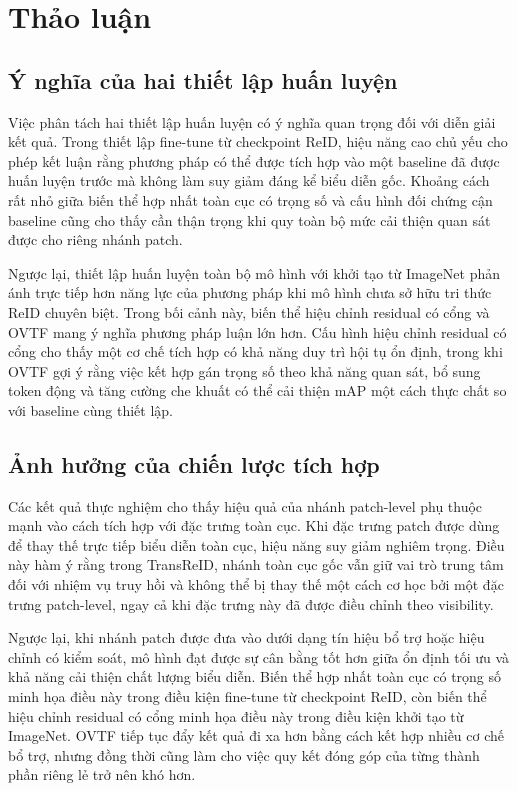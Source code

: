 \section{Thảo luận}
\label{sec:discussion}

\subsection{Ý nghĩa của hai thiết lập huấn luyện}

Việc phân tách hai thiết lập huấn luyện có ý nghĩa quan trọng đối với diễn giải kết quả. Trong thiết lập fine-tune từ checkpoint ReID, hiệu năng cao chủ yếu cho phép kết luận rằng phương pháp có thể được tích hợp vào một baseline đã được huấn luyện trước mà không làm suy giảm đáng kể biểu diễn gốc. Khoảng cách rất nhỏ giữa biến thể hợp nhất toàn cục có trọng số và cấu hình đối chứng cận baseline cũng cho thấy cần thận trọng khi quy toàn bộ mức cải thiện quan sát được cho riêng nhánh patch.

Ngược lại, thiết lập huấn luyện toàn bộ mô hình với khởi tạo từ ImageNet phản ánh trực tiếp hơn năng lực của phương pháp khi mô hình chưa sở hữu tri thức ReID chuyên biệt. Trong bối cảnh này, biến thể hiệu chỉnh residual có cổng và OVTF mang ý nghĩa phương pháp luận lớn hơn. Cấu hình hiệu chỉnh residual có cổng cho thấy một cơ chế tích hợp có khả năng duy trì hội tụ ổn định, trong khi OVTF gợi ý rằng việc kết hợp gán trọng số theo khả năng quan sát, bổ sung token động và tăng cường che khuất có thể cải thiện mAP một cách thực chất so với baseline cùng thiết lập.

\subsection{Ảnh hưởng của chiến lược tích hợp}

Các kết quả thực nghiệm cho thấy hiệu quả của nhánh patch-level phụ thuộc mạnh vào cách tích hợp với đặc trưng toàn cục. Khi đặc trưng patch được dùng để thay thế trực tiếp biểu diễn toàn cục, hiệu năng suy giảm nghiêm trọng. Điều này hàm ý rằng trong TransReID, nhánh toàn cục gốc vẫn giữ vai trò trung tâm đối với nhiệm vụ truy hồi và không thể bị thay thế một cách cơ học bởi một đặc trưng patch-level, ngay cả khi đặc trưng này đã được điều chỉnh theo visibility.

Ngược lại, khi nhánh patch được đưa vào dưới dạng tín hiệu bổ trợ hoặc hiệu
chỉnh có kiểm soát, mô hình đạt được sự cân bằng tốt hơn giữa ổn định tối ưu và
khả năng cải thiện chất lượng biểu diễn. Biến thể hợp nhất toàn cục có trọng số
minh họa điều này trong điều kiện fine-tune từ checkpoint ReID, còn biến thể
hiệu chỉnh residual có cổng minh họa điều này trong điều kiện khởi tạo từ
ImageNet. OVTF tiếp tục đẩy kết quả đi xa hơn bằng cách kết hợp nhiều cơ chế bổ
trợ, nhưng đồng thời cũng làm cho việc quy kết đóng góp của từng thành phần
riêng lẻ trở nên khó hơn.

